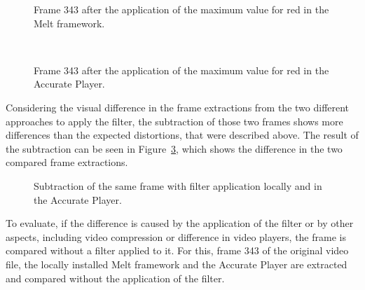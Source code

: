 \documentclass[../MasterThesis.tex]{subfiles}
\begin{document}
\begin{minipage}{0.48\textwidth}
	
	\begin{figure}[H]
		\begin{center}
			\caption[Frame 343 after the application of the maximum value for red in the Melt framework.]{Frame 343 after the application of the maximum value for red in the Melt framework.}
			\label{figure:redMelt}
		\end{center}
	\end{figure}
\end{minipage}\begin{minipage}{0.04\textwidth}
	\ 
\end{minipage}\begin{minipage}{0.48\textwidth}
	
	\begin{figure}[H]
		\begin{center}
			\caption[Frame 343 after the application of the maximum value for red in the Accurate Player.]{Frame 343 after the application of the maximum value for red in the Accurate Player.}
			\label{figure:redAP}
		\end{center}
	\end{figure}
\end{minipage}

\vspace*{2em}
Considering the visual difference in the frame extractions from the two different approaches to apply the filter, the subtraction of those two frames shows more differences than the expected distortions, that were described above. The result of the subtraction can be seen in Figure~\ref{figure:filterVSfilter}, which shows the difference in the two compared frame extractions.


\begin{figure}[H]
	\begin{center}
		\caption[Subtraction of the two different frames.]{Subtraction of the same frame with filter application locally and in the Accurate Player.}
		\label{figure:filterVSfilter}
	\end{center}
\end{figure}


To evaluate, if the difference is caused by the application of the filter or by other aspects, including video compression or difference in video players, the frame is compared without a filter applied to it. For this, frame 343 of the original video file, the locally installed Melt framework and the Accurate Player are extracted and compared without the application of the filter.
\end{document}
